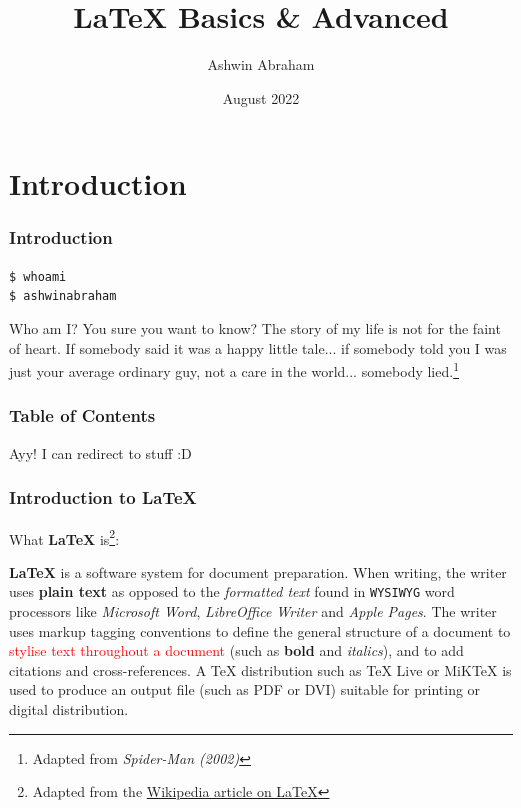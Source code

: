 \documentclass{beamer}
\title[\LaTeX{} Basics \& Advanced] 
{\LaTeX{} Basics \& Advanced}
\author[Ashwin Abraham] 
{Ashwin Abraham}
\institute[IIT-B] 
{
    IIT Bombay
}
\date[2022]
{August 2022}
\begin{document}
    \frame{\titlepage}

    \section{Introduction}
    {
        \begin{frame}
            \frametitle{Introduction}
                \texttt{\$ whoami\pause \\ \$ ashwinabraham}


            \pause
            Who am I? 
            You sure you want to know? 
            The story of my life is not for the faint of heart. 
            If somebody said it was a happy little tale... 
            if somebody told you I was just your average ordinary guy, not a care in the world... somebody lied.\footnote{Adapted from \textit{Spider-Man (2002)}}
        \end{frame}

        \begin{frame}
            \frametitle{Table of Contents}
            \tableofcontents
    
            Ayy! I can redirect to stuff :D
        \end{frame}
        
        \begin{frame}
            \frametitle{Introduction to \LaTeX{}}

            What \textbf{\LaTeX{}} is\footnote{Adapted from the \href{https://en.wikipedia.org/wiki/LaTeX}{Wikipedia article on \LaTeX{}}}:

            \textbf{\LaTeX{}} is a software system for document preparation. 
            When writing, the writer uses \textbf{plain text} \pause as opposed to the \textit{formatted text} found in \texttt{WYSIWYG} word processors like \textit{Microsoft Word}, \textit{LibreOffice Writer} and \textit{Apple Pages}. 
            \pause
            The writer uses markup tagging conventions to define the general structure of a document \pause to \textcolor{red}{stylise text throughout a document} (such as \textbf{bold} and \textit{italics})\pause, and to add citations and cross-references. 
            \pause
            A TeX distribution such as TeX Live or MiKTeX is used to produce an output file (such as PDF or DVI) suitable for printing or digital distribution.

        \end{frame}
    }
\end{document}
